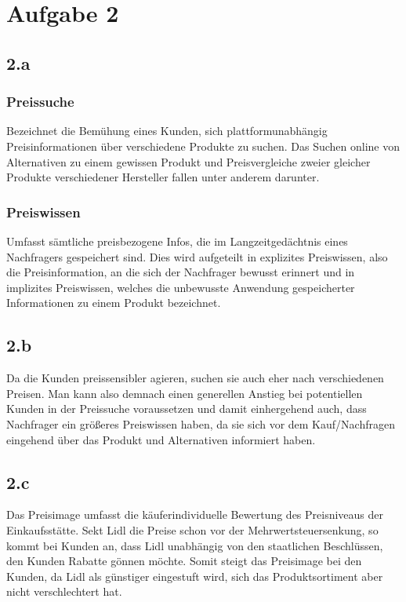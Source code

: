 \documentclass{article}
\begin{document}
\section{Aufgabe 2}
\subsection{2.a}
\subsubsection{Preissuche}
Bezeichnet die Bemühung eines Kunden, sich plattformunabhängig Preisinformationen über verschiedene Produkte zu suchen. Das Suchen online von Alternativen zu einem gewissen Produkt und Preisvergleiche zweier gleicher Produkte verschiedener Hersteller fallen unter anderem darunter.

\subsubsection{Preiswissen}
Umfasst sämtliche preisbezogene Infos, die im Langzeitgedächtnis eines Nachfragers gespeichert sind. Dies wird aufgeteilt in explizites Preiswissen, also die Preisinformation, an die sich der Nachfrager bewusst erinnert und in implizites Preiswissen, welches die unbewusste Anwendung gespeicherter Informationen zu einem Produkt bezeichnet.

\subsection{2.b}
Da die Kunden preissensibler agieren, suchen sie auch eher nach verschiedenen Preisen. Man kann also demnach einen generellen Anstieg bei potentiellen Kunden in der Preissuche voraussetzen und damit einhergehend auch, dass Nachfrager ein größeres Preiswissen haben, da sie sich vor dem Kauf/Nachfragen eingehend über das Produkt und Alternativen informiert haben.

\subsection{2.c}
Das Preisimage umfasst die käuferindividuelle Bewertung des Preisniveaus der Einkaufsstätte. Sekt Lidl die Preise schon vor der Mehrwertsteuersenkung, so kommt bei Kunden an, dass Lidl unabhängig von den staatlichen Beschlüssen, den Kunden Rabatte gönnen möchte. Somit steigt das Preisimage bei den Kunden, da Lidl als günstiger eingestuft wird, sich das Produktsortiment aber nicht verschlechtert hat.
\end{document}
